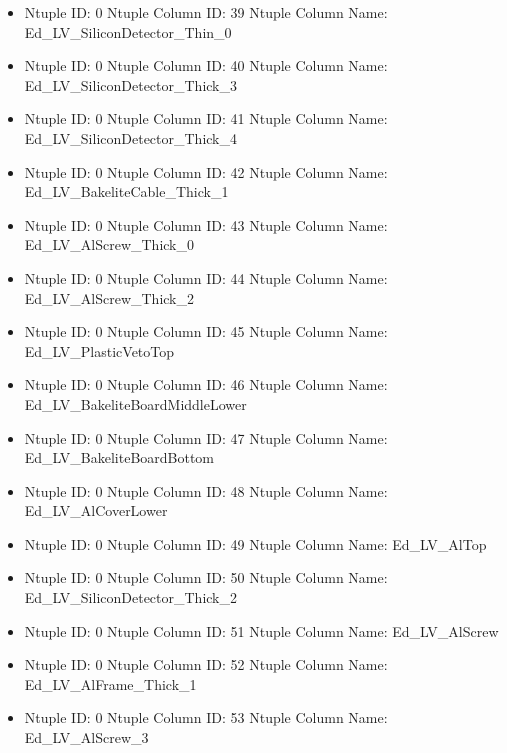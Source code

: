 \documentclass[8pt]{beamer}
\begin{document}
\begin{frame}
\begin{itemize}
        \item Ntuple ID: 0 Ntuple Column ID: 39 Ntuple Column Name: Ed\_LV\_SiliconDetector\_Thin\_0
        
        \item Ntuple ID: 0 Ntuple Column ID: 40 Ntuple Column Name: Ed\_LV\_SiliconDetector\_Thick\_3
        
        \item Ntuple ID: 0 Ntuple Column ID: 41 Ntuple Column Name: Ed\_LV\_SiliconDetector\_Thick\_4
        
        \item Ntuple ID: 0 Ntuple Column ID: 42 Ntuple Column Name: Ed\_LV\_BakeliteCable\_Thick\_1
        
        \item Ntuple ID: 0 Ntuple Column ID: 43 Ntuple Column Name: Ed\_LV\_AlScrew\_Thick\_0
        
        \item Ntuple ID: 0 Ntuple Column ID: 44 Ntuple Column Name: Ed\_LV\_AlScrew\_Thick\_2
        
        \item Ntuple ID: 0 Ntuple Column ID: 45 Ntuple Column Name: Ed\_LV\_PlasticVetoTop
        
        \item Ntuple ID: 0 Ntuple Column ID: 46 Ntuple Column Name: Ed\_LV\_BakeliteBoardMiddleLower
        
        \item Ntuple ID: 0 Ntuple Column ID: 47 Ntuple Column Name: Ed\_LV\_BakeliteBoardBottom
        
        \item Ntuple ID: 0 Ntuple Column ID: 48 Ntuple Column Name: Ed\_LV\_AlCoverLower
        
        \item Ntuple ID: 0 Ntuple Column ID: 49 Ntuple Column Name: Ed\_LV\_AlTop
        
        \item Ntuple ID: 0 Ntuple Column ID: 50 Ntuple Column Name: Ed\_LV\_SiliconDetector\_Thick\_2
        
        \item Ntuple ID: 0 Ntuple Column ID: 51 Ntuple Column Name: Ed\_LV\_AlScrew
        
        \item Ntuple ID: 0 Ntuple Column ID: 52 Ntuple Column Name: Ed\_LV\_AlFrame\_Thick\_1
        
        \item Ntuple ID: 0 Ntuple Column ID: 53 Ntuple Column Name: Ed\_LV\_AlScrew\_3
        

\end{itemize}
\end{frame}
\end{document}
